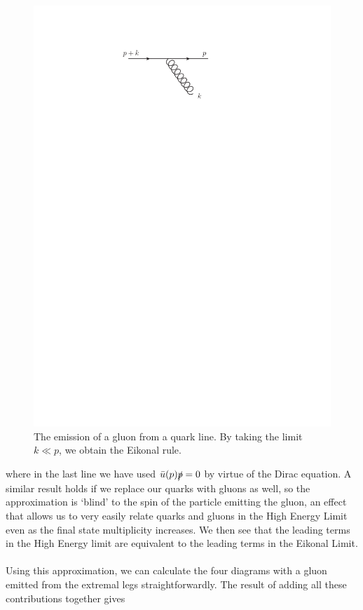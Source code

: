\begin{figure}[t]
\centering
\includegraphics[scale=1.5]{Images/eikonal.pdf} 
\caption{The emission of a gluon from a quark line. By taking the limit $k \ll p$, we obtain the Eikonal rule.}
\label{fig:eikonal}
\end{figure}

where in the last line we have used $\bar{u}(p) \slashed{p} = 0$ by virtue of the Dirac equation. A similar result holds if we replace our quarks with gluons as well, so the approximation is `blind' to the spin of the particle emitting the gluon, an effect that allows us to very easily relate quarks and gluons in the High Energy Limit even as the final state multiplicity increases. We then see that the leading terms in the High Energy limit are equivalent to the leading terms in the Eikonal Limit. \\
\\
Using this approximation, we can calculate the four diagrams with a gluon emitted from the extremal legs straightforwardly. The result of adding all these contributions together gives

